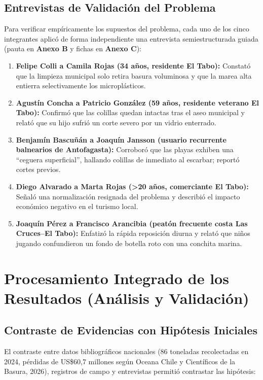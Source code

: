 \documentclass[12pt,letterpaper]{article}
\begin{document}
\subsection{Entrevistas de Validación del Problema}
Para verificar empíricamente los supuestos del problema, cada uno de los cinco integrantes aplicó de forma independiente una entrevista semiestructurada guiada (pauta en \textbf{Anexo B} y fichas en \textbf{Anexo C}):
\begin{enumerate}[leftmargin=*, noitemsep, topsep=0pt]
    \item \textbf{Felipe Colli a Camila Rojas (34 años, residente El Tabo):} Constató que la limpieza municipal solo retira basura voluminosa y que la marea alta entierra selectivamente los microplásticos.
    \item \textbf{Agustín Concha a Patricio González (59 años, residente veterano El Tabo):} Confirmó que las colillas quedan intactas tras el aseo municipal y relató que su hijo sufrió un corte severo por un vidrio enterrado.
    \item \textbf{Benjamín Bascuñán a Joaquín Jansson (usuario recurrente balnearios de Antofagasta):} Corroboró que las playas exhiben una ``ceguera superficial'', hallando colillas de inmediato al escarbar; reportó cortes previos.
    \item \textbf{Diego Alvarado a Marta Rojas (>20 años, comerciante El Tabo):} Señaló una normalización resignada del problema y describió el impacto económico negativo en el turismo local.
    \item \textbf{Joaquín Pérez a Francisco Arancibia (peatón frecuente costa Las Cruces--El Tabo):} Enfatizó la rápida reposición diurna y relató que niños jugando confundieron un fondo de botella roto con una conchita marina.
\end{enumerate}

\section{Procesamiento Integrado de los Resultados (Análisis y Validación)}

\subsection{Contraste de Evidencias con Hipótesis Iniciales}
El contraste entre datos bibliográficos nacionales (86 toneladas recolectadas en 2024, pérdidas de US\$60,7 millones según Oceana Chile y Científicos de la Basura, 2026), registros de campo y entrevistas permitió contrastar las hipótesis:
\end{document}
